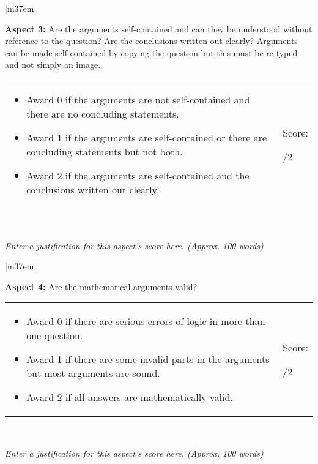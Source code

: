 \documentclass[article,11pt]{book}
\begin{document}
\begin{tabular}{|m{37em}|}
    \hline
    
    \textbf{Aspect 3:} Are the arguments self-contained and can they be understood without reference to the question? Are the conclusions written out clearly? Arguments can be made self-contained by copying the question but this must be re-typed and not simply an image. 
    \\ \hline
    
    \begin{tabular}{m{32em}|m{5em}}
      \begin{itemize}
          \item Award 0 if the arguments are not self-contained and there are no concluding statements.
          \item Award 1 if the arguments are self-contained or there are concluding statements but not both.
          \item Award 2 if the arguments are self-contained and the conclusions written out clearly.
      \end{itemize}  
      &  
      Score: 
      
      \medskip
      {\huge  /2}
    \end{tabular} 
    \\ \hline
    
    \textit{Enter a justification for this aspect’s score here. (Approx. 100 words)}
    \\ \hline
\end{tabular}

\bigskip


\begin{tabular}{|m{37em}|}
    \hline
    
    \textbf{Aspect 4:} Are the mathematical arguments valid? 
    \\ \hline
    
    \begin{tabular}{m{32em}|m{5em}}
      \begin{itemize}
          \item Award 0 if there are serious errors of logic in more than one question.
          \item Award 1 if there are some invalid parts in the arguments but most arguments are sound.
          \item Award 2 if all answers are mathematically valid.
      \end{itemize}  
      &  
      Score: 
      
      \medskip
      {\huge  /2}
    \end{tabular} 
    \\ \hline
    
    \textit{Enter a justification for this aspect’s score here. (Approx. 100 words)}
    \\ \hline
\end{tabular}
\end{document}
